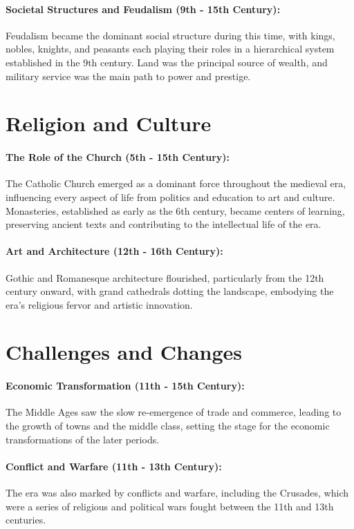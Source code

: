 \documentclass[a4paper,12pt]{book}
\begin{document}
\paragraph{Societal Structures and Feudalism (9th - 15th Century):}
Feudalism became the dominant social structure during this time, with kings, nobles, knights, and peasants each playing their roles in a hierarchical system established in the 9th century. Land was the principal source of wealth, and military service was the main path to power and prestige.

\section*{Religion and Culture}

\paragraph{The Role of the Church (5th - 15th Century):}
The Catholic Church emerged as a dominant force throughout the medieval era, influencing every aspect of life from politics and education to art and culture. Monasteries, established as early as the 6th century, became centers of learning, preserving ancient texts and contributing to the intellectual life of the era.

\paragraph{Art and Architecture (12th - 16th Century):}
Gothic and Romanesque architecture flourished, particularly from the 12th century onward, with grand cathedrals dotting the landscape, embodying the era’s religious fervor and artistic innovation.

\section*{Challenges and Changes}

\paragraph{Economic Transformation (11th - 15th Century):}
The Middle Ages saw the slow re-emergence of trade and commerce, leading to the growth of towns and the middle class, setting the stage for the economic transformations of the later periods.

\paragraph{Conflict and Warfare (11th - 13th Century):}
The era was also marked by conflicts and warfare, including the Crusades, which were a series of religious and political wars fought between the 11th and 13th centuries.
\end{document}
